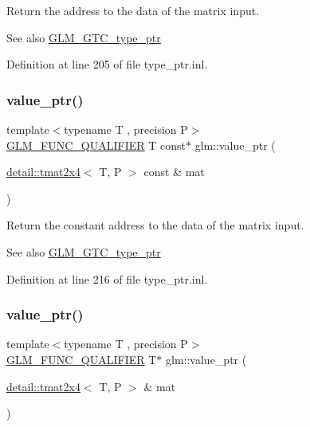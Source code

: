 Return the address to the data of the matrix input. \begin{DoxySeeAlso}{See also}
\hyperlink{group__gtc__type__ptr}{G\+L\+M\+\_\+\+G\+T\+C\+\_\+type\+\_\+ptr} 
\end{DoxySeeAlso}


Definition at line 205 of file type\+\_\+ptr.\+inl.

\mbox{\label{group__gtc__type__ptr_ga7b738eac576043c00c39bda2fc515d7b}} 
\subsubsection{\texorpdfstring{value\+\_\+ptr()}{value\_ptr()}\hspace{0.1cm}{\footnotesize\ttfamily [18/27]}}
{\footnotesize\ttfamily template$<$typename T , precision P$>$ \\
\hyperlink{setup_8hpp_a33fdea6f91c5f834105f7415e2a64407}{G\+L\+M\+\_\+\+F\+U\+N\+C\+\_\+\+Q\+U\+A\+L\+I\+F\+I\+ER} T const$\ast$ glm\+::value\+\_\+ptr (\begin{DoxyParamCaption}\item[{\hyperlink{structglm_1_1detail_1_1tmat2x4}{detail\+::tmat2x4}$<$ T, P $>$ const \&}]{mat }\end{DoxyParamCaption})}

Return the constant address to the data of the matrix input. \begin{DoxySeeAlso}{See also}
\hyperlink{group__gtc__type__ptr}{G\+L\+M\+\_\+\+G\+T\+C\+\_\+type\+\_\+ptr} 
\end{DoxySeeAlso}


Definition at line 216 of file type\+\_\+ptr.\+inl.

\mbox{\label{group__gtc__type__ptr_ga59b17271f4f487e556383b715f9b8534}} 
\subsubsection{\texorpdfstring{value\+\_\+ptr()}{value\_ptr()}\hspace{0.1cm}{\footnotesize\ttfamily [19/27]}}
{\footnotesize\ttfamily template$<$typename T , precision P$>$ \\
\hyperlink{setup_8hpp_a33fdea6f91c5f834105f7415e2a64407}{G\+L\+M\+\_\+\+F\+U\+N\+C\+\_\+\+Q\+U\+A\+L\+I\+F\+I\+ER} T$\ast$ glm\+::value\+\_\+ptr (\begin{DoxyParamCaption}\item[{\hyperlink{structglm_1_1detail_1_1tmat2x4}{detail\+::tmat2x4}$<$ T, P $>$ \&}]{mat }\end{DoxyParamCaption})}

